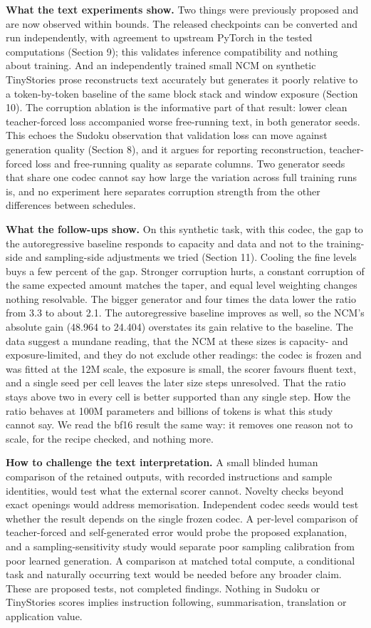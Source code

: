 \documentclass[
  british,
]{article}
\begin{document}
\textbf{What the text experiments show.} Two things were previously
proposed and are now observed within bounds. The released checkpoints
can be converted and run independently, with agreement to upstream
PyTorch in the tested computations (Section 9); this validates inference
compatibility and nothing about training. And an independently trained
small NCM on synthetic TinyStories prose reconstructs text accurately
but generates it poorly relative to a token-by-token baseline of the
same block stack and window exposure (Section 10). The corruption
ablation is the informative part of that result: lower clean
teacher-forced loss accompanied worse free-running text, in both
generator seeds. This echoes the Sudoku observation that validation loss
can move against generation quality (Section 8), and it argues for
reporting reconstruction, teacher-forced loss and free-running quality
as separate columns. Two generator seeds that share one codec cannot say
how large the variation across full training runs is, and no experiment
here separates corruption strength from the other differences between
schedules.

\textbf{What the follow-ups show.} On this synthetic task, with this
codec, the gap to the autoregressive baseline responds to capacity and
data and not to the training-side and sampling-side adjustments we tried
(Section 11). Cooling the fine levels buys a few percent of the gap.
Stronger corruption hurts, a constant corruption of the same expected
amount matches the taper, and equal level weighting changes nothing
resolvable. The bigger generator and four times the data lower the ratio
from 3.3 to about 2.1. The autoregressive baseline improves as well, so
the NCM's absolute gain (48.964 to 24.404) overstates its gain relative
to the baseline. The data suggest a mundane reading, that the NCM at
these sizes is capacity- and exposure-limited, and they do not exclude
other readings: the codec is frozen and was fitted at the 12M scale, the
exposure is small, the scorer favours fluent text, and a single seed per
cell leaves the later size steps unresolved. That the ratio stays above
two in every cell is better supported than any single step. How the
ratio behaves at 100M parameters and billions of tokens is what this
study cannot say. We read the bf16 result the same way: it removes one
reason not to scale, for the recipe checked, and nothing more.

\textbf{How to challenge the text interpretation.} A small blinded human
comparison of the retained outputs, with recorded instructions and
sample identities, would test what the external scorer cannot. Novelty
checks beyond exact openings would address memorisation. Independent
codec seeds would test whether the result depends on the single frozen
codec. A per-level comparison of teacher-forced and self-generated error
would probe the proposed explanation, and a sampling-sensitivity study
would separate poor sampling calibration from poor learned generation. A
comparison at matched total compute, a conditional task and naturally
occurring text would be needed before any broader claim. These are
proposed tests, not completed findings. Nothing in Sudoku or TinyStories
scores implies instruction following, summarisation, translation or
application value.
\end{document}
